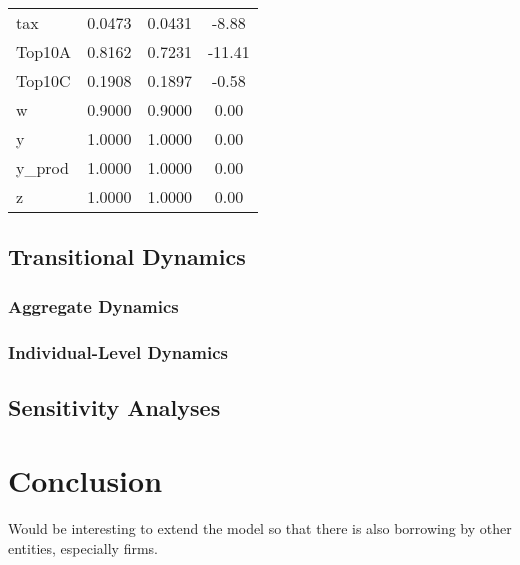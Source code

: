 \documentclass[12pt]{article} %
\numberwithin{equation}{section} %
\begin{document}
\begin{center}
\begin{tabular}{lccc}
          tax &                0.0473 &                 0.0431 &        -8.88 \\
       Top10A &                0.8162 &                 0.7231 &       -11.41 \\
       Top10C &                0.1908 &                 0.1897 &        -0.58 \\
            w &                0.9000 &                 0.9000 &         0.00 \\
            y &                1.0000 &                 1.0000 &         0.00 \\
       y\_prod &                1.0000 &                 1.0000 &         0.00 \\
            z &                1.0000 &                 1.0000 &         0.00 \\
\end{tabular}
\end{center}

\subsection{Transitional Dynamics}
\label{sec:results-transition}

\subsubsection{Aggregate Dynamics}
\label{sec:results-transition-agg}

\subsubsection{Individual-Level Dynamics}
\label{sec:results-transition-ind}

\subsection{Sensitivity Analyses}
\label{sec:results-sensitivity}

\section{Conclusion}
\label{sec:conclusion}

Would be interesting to extend the model so  that there is also borrowing by other entities, especially firms.
\end{document}
